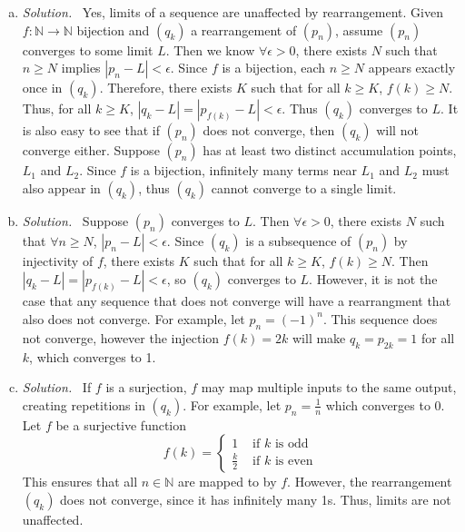 \documentclass[12pt]{article}
\newcommand{\bbN}{\mathbb{N}}
\renewcommand{\_}[1]{\underline{ #1 }}
\theoremstyle{definition}
\newenvironment{exercise}[1]
  {\renewcommand\theinnercustomthm{#1}\innercustomthm}
  {\endinnercustomthm}
\newenvironment{solution}{\par\noindent\textit{Solution.}\ }{\par}
\numberwithin{equation}{subsection}
\begin{document}
\begin{exercise}{12}
    \begin{enumerate} [(a)]
        \item \begin{solution}
            Yes, limits of a sequence are unaffected by rearrangement. Given $f: \bbN \to \bbN$ bijection and $(q_k)$ a rearrangement of $(p_n)$, assume $(p_n)$ converges to some limit $L$. Then we know $\forall \epsilon > 0$, there exists $N$ such that $n \ge N$ implies $|p_n - L| < \epsilon$. Since $f$ is a bijection, each $n \ge N$ appears exactly once in $(q_k)$. Therefore, there exists $K$ such that for all $k \ge K$, $f(k) \ge N$. Thus, for all $k \ge K$, $|q_k - L| = |p_{f(k)} - L| < \epsilon$. Thus $(q_k)$ converges to $L$. It is also easy to see that if $(p_n)$ does not converge, then $(q_k)$ will not converge either. Suppose $(p_n)$ has at least two distinct accumulation points, $L_1$ and $L_2$. Since $f$ is a bijection, infinitely many terms near $L_1$ and $L_2$ must also appear in $(q_k)$, thus $(q_k)$ cannot converge to a single limit. 
        \end{solution}
        \item \begin{solution}
            Suppose $(p_n)$ converges to $L$. Then $\forall \epsilon > 0$, there exists $N$ such that $\forall n \ge N$, $|p_n - L| < \epsilon$. Since $(q_k)$ is a subsequence of $(p_n)$ by injectivity of $f$, there exists $K$ such that for all $k \ge K$, $f(k) \ge N$. Then $|q_k - L| = |p_{f(k)} - L| < \epsilon$, so $(q_k)$ converges to $L$. However, it is not the case that any sequence that does not converge will have a rearrangment that also does not converge. For example, let $p_n = (-1)^n$. This sequence does not converge, however the injection $f(k) = 2k$ will make $q_k = p_{2k} = 1$ for all $k$, which converges to 1.
        \end{solution}
        \item \begin{solution}
            If $f$ is a surjection, $f$ may map multiple inputs to the same output, creating repetitions in $(q_k)$. For example, let $p_n = \frac{1}{n}$ which converges to 0. Let $f$ be a surjective function \begin{equation*} f(k) = 
                \begin{cases}
                    1 & \text{ if } k \text{ is odd} \\
                    \frac{k}{2} & \text{ if } k \text{ is even}
                \end{cases}
            \end{equation*}
            This ensures that all $n \in \bbN$ are mapped to by $f$. However, the rearrangement $(q_k)$ does not converge, since it has infinitely many 1s. Thus, limits are not unaffected.
        \end{solution}
    \end{enumerate}
\end{exercise}
\end{document}
